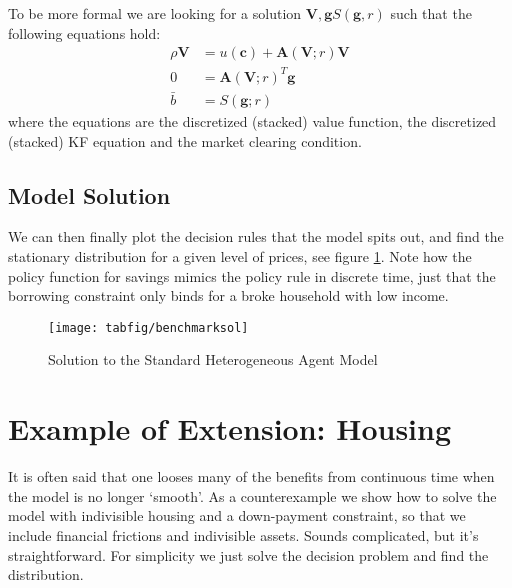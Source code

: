\documentclass[12pt]{article}
\DeclareMathOperator{\1}{\mathbbm{1}}
\begin{document}
To be more formal we are looking for a solution $\mathbf{V},\mathbf{g}S(\mathbf{g},r)$ such that the following equations hold:
\begin{equation}
\begin{split}
\rho \mathbf{V}&=u(\mathbf{c}) + \mathbf{A}(\mathbf{V};r) \mathbf{V} \\
0 &= \mathbf{A}(\mathbf{V};r)^T \mathbf{g} \\
\bar b &= S(\mathbf{g};r)
\end{split}
\end{equation}
where the equations are the discretized (stacked) value function, the discretized (stacked) KF equation and the market clearing condition.



\subsection{Model Solution}
We can then finally plot the decision rules that the model spits out, and find the stationary distribution for a given level of prices, see figure \ref{fig:solBenchmark}. Note how the policy function for savings mimics the policy rule in discrete time, just that the borrowing constraint only binds for a broke household with low income.
\begin{figure}
\center
\caption{Solution to the Standard Heterogeneous Agent Model}
\label{fig:solBenchmark}
\texttt{[image: tabfig/benchmarksol]}
\end{figure}

\section{Example of Extension: Housing}
It is often said that one looses many of the benefits from continuous time when the model is no longer `smooth'. As a counterexample we show how to solve the model with indivisible housing and a down-payment constraint, so that we include financial frictions and indivisible assets. Sounds complicated, but it's straightforward. For simplicity we just solve the decision problem and find the distribution.
\end{document}

